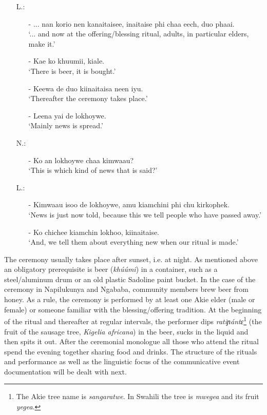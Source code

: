 \documentclass[output=paper,colorlinks,citecolor=brown]{langscibook}
\begin{document}
\begin{enumerate}
    \item[L.:]
    \begin{enumerate}
        \item[-]    ... nan korio nen kanaitaisee, inaitaise phi chaa eech, duo phaai.\\
                    `... and now at the offering/blessing ritual, adults, in particular elders, make it.'
        \item[-]    Kae ko khuumii, kiale.\\
                    `There is beer, it is bought.'
        \item[-]    Keewa de duo kiinaitaisa neen iyu.\\
                    `Thereafter the ceremony takes place.'
        \item[-]    Leena yai de lokhoywe.\\
                    `Mainly news is spread.'
    \end{enumerate}
    \item[N.:]
    \begin{enumerate}
        \item[-]    Ko an lokhoywe chaa kimwaau?\\
                    `This is which kind of news that is said?' 
    \end{enumerate}
    \item[L.:]
    \begin{enumerate}
        \item[-]    Kimwaau isoo de lokhoywe, amu kiamchini phi chu kirkophek. \\
                    `News is just now told, because this we tell people who have passed away.'
        \item[-]    Ko chichee kiamchin lokhoo, kiinaitaise. \\
                    `And, we tell them about everything new when our ritual is made.'
    \end{enumerate}
\end{enumerate}
\z

The ceremony usually takes place after sunset, i.e. at night. As mentioned above an obligatory prerequisite is beer (\textit{khúúmi}) in a container, such as a steel\slash aluminum drum or an old plastic Sadoline paint bucket. In the case of the ceremony in Napilukunya and Ngababa, community members brew beer from honey. As a rule, the ceremony is performed by at least one Akie elder (male or female) or someone familiar with the blessing/offering tradition. At the beginning of the ritual and thereafter at regular intervals, the performer dips \textit{ratiɲántɛ}\footnote{The Akie tree name is \textit{sangaratwe}. In Swahili the tree is \textit{mwegea} and its fruit \textit{yegea}.} (the fruit of the sausage tree, \textit{Kigelia africana}) in the beer, sucks in the liquid and then spits it out. After the ceremonial monologue all those who attend the ritual spend the evening together sharing food and drinks. The structure of the rituals and performance as well as the linguistic focus of the communicative event documentation  will be dealt with next.
\end{document}
